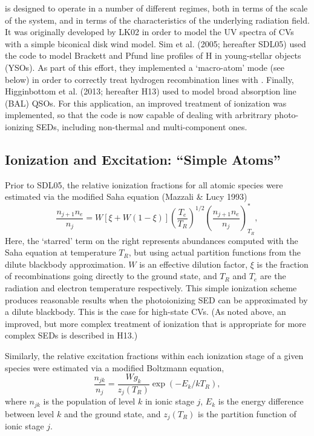 \documentclass[preprint, a4paper, 11pt]{aastex}
\begin{document}
\py is designed to operate in a number of different
regimes, both in terms of the scale of the system, and in terms of the
characteristics of the underlying radiation field.
It was originally developed by LK02 in order to model the UV spectra
of CVs with a simple biconical disk wind model. Sim et al. (2005;
hereafter SDL05)\nocite{simmacro2005} used the code to model Brackett
and Pfund line profiles of H in young-stellar objects (YSOs). As part
of this effort, they implemented a `macro-atom' mode (see below) in
order to correctly treat hydrogen recombination lines with
\py. Finally, Higginbottom et al.\nocite{higginbottom2013} (2013;
hereafter H13) used \py to model broad absorption line (BAL) QSOs. For
this application, an improved treatment of ionization was implemented,
so that the code is now capable of dealing with arbritrary
photo-ionizing SEDs, including non-thermal and multi-component ones. 

\subsection{Ionization and Excitation: ``Simple Atoms''}
\label{simpleatoms}

Prior to SDL05, the relative ionization fractions for all atomic
species were estimated via the modified Saha equation (Mazzali \&
Lucy 1993)  
\begin{equation}
\frac{n_{j+1} n_e}{n_j} = W [\xi + W(1-\xi)]
\left(\frac{T_e}{T_R}\right)^{1/2}
\left(\frac{n_{j+1}n_e}{n_j}\right)^*_{T_R}, \label{ionization}
\end{equation}
Here, the `starred' term on the right represents abundances computed with
the Saha equation at temperature $T_R$, but using actual partition functions
from the dilute blackbody approximation. 
$W$ is an effective dilution factor, $\xi$ is the
fraction of recombinations going directly to the ground state, and
$T_R$ and $T_e$ are the radiation and electron temperature
respectively. This simple ionization scheme produces reasonable
results when the photoionizing SED can be approximated by a dilute
blackbody. This is the case for high-state CVs. (As noted above, an
improved, but more complex treatment of ionization that is appropriate
for more complex SEDs is described in H13.) 

Similarly, the relative excitation fractions within each ionization
stage of a given species were estimated via a modified Boltzmann
equation,
\begin{equation}
\frac{n_{jk}}{n_j} = \frac{W g_k}{z_j(T_R)} \exp(-E_k/kT_R),
\end{equation}
where $n_{jk}$ is the population of level $k$ in ionic stage $j$,
$E_k$ is the energy difference between level $k$ and the ground state,
and $z_j(T_R)$ is the partition function of ionic stage $j$. 
\end{document}
